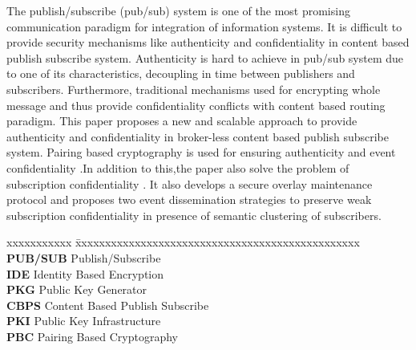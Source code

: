 \documentclass[MTech]{iitmdiss}
\begin{document}
\noindent 
The publish/subscribe (pub/sub) system is one of the most promising communication paradigm for integration of information systems. It is difficult to provide security mechanisms like authenticity and confidentiality in content based publish subscribe system. Authenticity is hard to achieve in pub/sub system due to one of its characteristics, decoupling in time between publishers and subscribers. Furthermore, traditional mechanisms used for encrypting whole message and thus provide confidentiality conflicts with content based routing paradigm. This paper proposes a new and scalable approach to provide authenticity and confidentiality in broker-less content based publish subscribe system. Pairing based cryptography is used for ensuring authenticity and event confidentiality .In addition to this,the paper also solve the problem of subscription confidentiality . It also develops a secure overlay maintenance protocol and proposes two event dissemination strategies to preserve weak subscription confidentiality in presence of semantic clustering of subscribers. 
\pagebreak



\begin{singlespace}
\tableofcontents
\thispagestyle{empty}
\listoftables
{}
\listoffigures
{}
\end{singlespace}


\abbreviations

\noindent 
\begin{tabbing}
xxxxxxxxxxx \= xxxxxxxxxxxxxxxxxxxxxxxxxxxxxxxxxxxxxxxxxxxxxxxx \kill
\textbf{PUB/SUB}   \> Publish/Subscribe  \\
\textbf{IDE} \> Identity Based Encryption \\
\textbf{PKG} \> Public Key Generator \\
\textbf{CBPS} \> Content Based Publish Subscribe \\
\textbf{PKI} \> Public Key Infrastructure \\
\textbf{PBC} \> Pairing Based Cryptography \\
\end{tabbing}

\pagebreak

\end{document}
